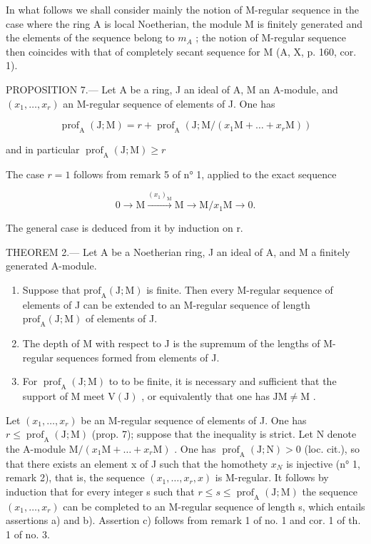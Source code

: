 In what follows we shall consider mainly the notion of M-regular sequence in the case where the ring A is local Noetherian, the module M is finitely generated and the elements of the sequence belong to \(m_{A}\) ; the notion of M-regular sequence then coincides with that of completely secant sequence for M (A, X, p. 160, cor. 1).

PROPOSITION 7.--- Let A be a ring, J an ideal of A, M an A-module, and \((x_{1},\ldots,x_{r})\) an M-regular sequence of elements of J. One has

\[
\operatorname{prof} _ {\mathrm{A}} (\mathrm{J}; \mathrm{M}) = r + \operatorname{prof} _ {\mathrm{A}} (\mathrm{J}; \mathrm{M} / (x _ {1} \mathrm{M} + \dots + x _ {r} \mathrm{M}))
\]

and in particular \(\operatorname{prof}_{\mathrm{A}}(\mathrm{J};\mathrm{M})\geqslant r\)

The case \(r=1\) follows from remark 5 of n° 1, applied to the exact sequence

\[
0 \rightarrow \mathrm{M} \xrightarrow {(x _ {1}) _ {\mathrm{M}}} \mathrm{M} \longrightarrow \mathrm{M} / x _ {1} \mathrm{M} \rightarrow 0.
\]

The general case is deduced from it by induction on r.

THEOREM 2.--- Let A be a Noetherian ring, J an ideal of A, and M a finitely generated A-module.

\begin{enumerate}
\def\labelenumi{\alph{enumi})}
\item
  Suppose that \(\mathrm{prof}_{\mathrm{A}}(\mathrm{J};\mathrm{M})\) is finite. Then every M-regular sequence of elements of J can be extended to an M-regular sequence of length \(\mathrm{prof}_{\mathrm{A}}(\mathrm{J};\mathrm{M})\) of elements of J.
\item
  The depth of M with respect to J is the supremum of the lengths of M-regular sequences formed from elements of J.
\item
  For \(\operatorname{prof}_{\mathrm{A}}(\mathrm{J};\mathrm{M})\) to to be finite, it is necessary and sufficient that the support of M meet \(\mathrm{V}(\mathrm{J})\) , or equivalently that one has \(\mathrm{JM} \neq \mathrm{M}\) .
\end{enumerate}

Let \((x_{1},\ldots,x_{r})\) be an M-regular sequence of elements of J. One has \(r\leqslant\operatorname{prof}_{\mathrm{A}}(\mathrm{J};\mathrm{M})\) (prop. 7); suppose that the inequality is strict. Let N denote the A-module \(\mathrm{M}/(x_{1}\mathrm{M}+\ldots+x_{r}\mathrm{M})\) . One has \(\operatorname{prof}_{\mathrm{A}}(\mathrm{J};\mathrm{N})>0\) (loc. cit.), so that there exists an element x of J such that the homothety \(x_{N}\) is injective (n° 1, remark 2), that is, the sequence \((x_{1},\ldots,x_{r},x)\) is M-regular. It follows by induction that for every integer s such that \(r\leqslant s\leqslant\operatorname{prof}_{\mathrm{A}}(\mathrm{J};\mathrm{M})\) the sequence \((x_{1},\ldots,x_{r})\) can be completed to an M-regular sequence of length s, which entails assertions a) and b). Assertion c) follows from remark 1 of no. 1 and cor. 1 of th. 1 of no. 3.

